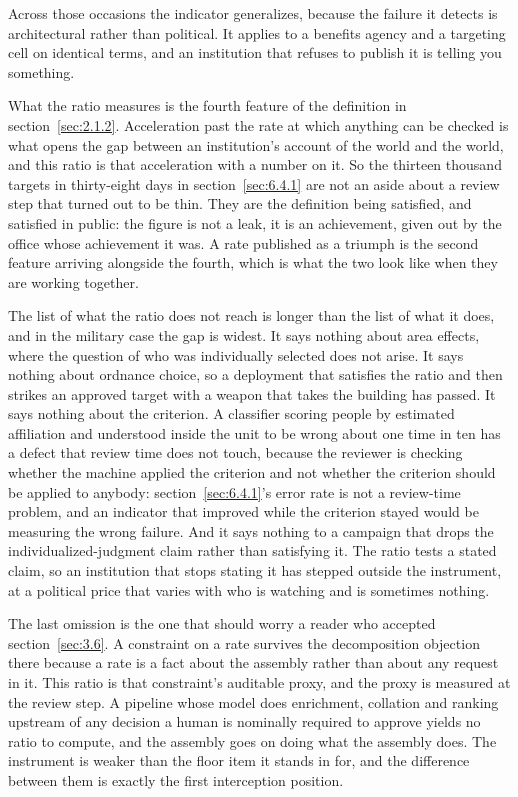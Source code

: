 Across those occasions the indicator generalizes, because the failure it detects is architectural rather than political. It applies to a benefits agency and a targeting cell on identical terms, and an institution that refuses to publish it is telling you something.

What the ratio measures is the fourth feature of the definition in section~\ref{sec:2.1.2}. Acceleration past the rate at which anything can be checked is what opens the gap between an institution's account of the world and the world, and this ratio is that acceleration with a number on it. So the thirteen thousand targets in thirty-eight days in section~\ref{sec:6.4.1} are not an aside about a review step that turned out to be thin. They are the definition being satisfied, and satisfied in public: the figure is not a leak, it is an achievement, given out by the office whose achievement it was. A rate published as a triumph is the second feature arriving alongside the fourth, which is what the two look like when they are working together.

The list of what the ratio does not reach is longer than the list of what it does, and in the military case the gap is widest. It says nothing about area effects, where the question of who was individually selected does not arise. It says nothing about ordnance choice, so a deployment that satisfies the ratio and then strikes an approved target with a weapon that takes the building has passed. It says nothing about the criterion. A classifier scoring people by estimated affiliation and understood inside the unit to be wrong about one time in ten has a defect that review time does not touch, because the reviewer is checking whether the machine applied the criterion and not whether the criterion should be applied to anybody: section~\ref{sec:6.4.1}'s error rate is not a review-time problem, and an indicator that improved while the criterion stayed would be measuring the wrong failure. And it says nothing to a campaign that drops the individualized-judgment claim rather than satisfying it. The ratio tests a stated claim, so an institution that stops stating it has stepped outside the instrument, at a political price that varies with who is watching and is sometimes nothing.

The last omission is the one that should worry a reader who accepted section~\ref{sec:3.6}. A constraint on a rate survives the decomposition objection there because a rate is a fact about the assembly rather than about any request in it. This ratio is that constraint's auditable proxy, and the proxy is measured at the review step. A pipeline whose model does enrichment, collation and ranking upstream of any decision a human is nominally required to approve yields no ratio to compute, and the assembly goes on doing what the assembly does. The instrument is weaker than the floor item it stands in for, and the difference between them is exactly the first interception position.


